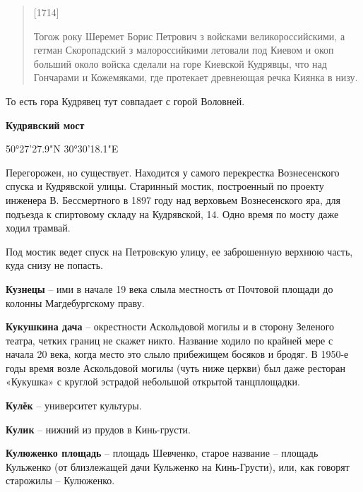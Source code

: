 \begin{quotation}
[1714]

Тогож року Шеремет Борис Петрович з войсками великороссийскими, а гетман Скоропадский з малороссийкими летовали под Киевом и окоп больший около войска сделали на горе Киевской Кудрявцы, что над Гончарами и Кожемяками, где протекает древнеющая речка Киянка в низу.
\end{quotation}

То есть гора Кудрявец тут совпадает с горой Воловней.\\


\medskip

\textbf{Кудрявский мост}

50°27'27.9"N 30°30'18.1"E

Перегорожен, но существует. Находится у самого перекрестка Вознесенского спуска и Кудрявской улицы. Старинный мостик, построенный по проекту инженера В. Бессмертного в 1897 году над верховьем Вознесенского яра, для подъезда к спиртовому складу на Кудрявской, 14. Одно время по мосту даже ходил трамвай.

Под мостик ведет спуск на Петровcкую улицу, ее заброшенную верхнюю часть, куда снизу не попасть.\\

\medskip


\textbf{Кузнецы} – ими в начале 19 века слыла местность от Почтовой площади до колонны Магдебургскому праву.\\

\medskip


\textbf{Кукушкина дача} – окрестности Аскольдовой могилы и в сторону Зеленого театра, четких границ не скажет никто. Название ходило по крайней мере с начала 20 века, когда место это слыло прибежищем босяков и бродяг. В 1950-е годы время возле Аскольдовой могилы (чуть ниже церкви) был даже ресторан «Кукушка» с круглой эстрадой небольшой открытой танцплощадки. \\

\medskip

\textbf{Кулёк} – университет культуры.\\


\medskip

\textbf{Кулик} – нижний из прудов в Кинь-грусти.\\

\medskip

\textbf{Кулюженко площадь} – площадь Шевченко, старое название – площадь Кульженко (от близлежащей дачи Кульженко на Кинь-Грусти), или, как говорят старожилы – Кулюженко.\\


